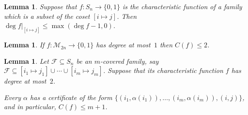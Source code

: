 \documentclass[10pt,a4paper]{article}
\newtheorem{lemma}[theorem]{Lemma}
\theoremstyle{definition}
\providecommand{\coset}[2]{[#1 \mapsto #2]}
\providecommand{\cM}{\mathcal{M}}
\begin{document}
\begin{lemma} \label{lem:degree-reduction-sym}
Suppose that $f\colon S_n \to \{0,1\}$ is the characteristic function of a family which is a subset of the coset $\coset{i}{j}$. Then $\deg f|_{\coset{i}{j}} \leq \max( \deg f - 1, 0 )$.
\end{lemma}

\begin{lemma} \label{lem:degree1-cert-pms}
If $f\colon \cM_{2n} \to \{0,1\}$ has degree at most~$1$ then $C(f) \leq 2$.
\end{lemma}

\begin{lemma} \label{lem:structure-sym}
Let $\mathcal{F} \subseteq S_n$ be an $m$-covered family, say $\mathcal{F} \subseteq \coset{i_1}{j_1} \cup \cdots \cup \coset{i_m}{j_m}$. Suppose that its characteristic function $f$ has degree at most~$2$.

Every $\alpha$ has a certificate of the form $\{(i_1,\alpha(i_1)),\ldots,(i_m,\alpha(i_m)),(i,j)\}$, and in particular, $C(f) \leq m + 1$.
\end{lemma}
\end{document}
